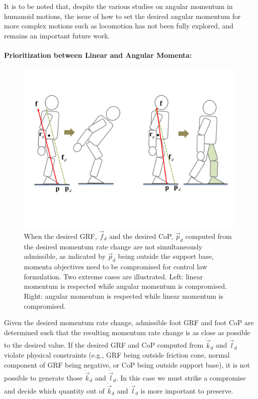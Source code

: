 \documentclass{llncs}
\newcommand{\vp}{\vec{p}}
\newcommand{\vf}{\vec{f}}
\newcommand{\vdk} {\dot{\vec{k}}}
\newcommand{\vdl} {\dot{\vec{l}}}
\begin{document}
It is to be noted that, despite the various studies on angular momentum in humanoid motions,
the issue of how to set the desired angular momentum for more complex motions such as locomotion has not been fully explored, and remains an important
future work.

\paragraph{Prioritization between Linear and Angular Momenta:}
\label{sec:prioritization}

\begin{figure}[h]
\begin{center}
\includegraphics[width = 0.6\columnwidth]{Figures/two_cases_new.pdf}
\end{center}
\caption{
When the desired GRF, $\vf_d$ and the desired CoP, $\vp_d$ computed from
the desired momentum rate change are not simultaneously admissible,
as indicated by $\vp_d$ being outside the support base,
momenta objectives need to be compromised for control law formulation.
Two extreme cases are illustrated.
Left: linear momentum is respected while angular momentum is compromised.
Right: angular momentum is respected while linear momentum is compromised.
}
\label{fig:two_cases}
\end{figure}

Given the desired momentum rate change, 
admissible foot GRF and foot CoP are determined such that the resulting momentum
rate change is as close as possible to the desired value.
If the desired GRF and CoP computed from $\vdk_d$ and $\vdl_d$
violate physical constraints (e.g., GRF being outside friction cone,
normal component of GRF being negative, or CoP being
outside support base), it is not possible
to generate those $\vdk_d$ and $\vdl_d$. In this case we must strike
a compromise and decide which quantity out of $\vdk_d$ and $\vdl_d$ is more
important to preserve.
\end{document}
